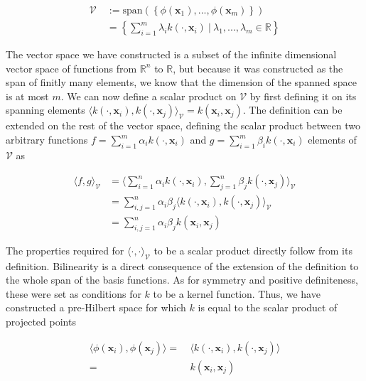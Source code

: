 \begin{equation*}
  \begin{aligned}
    \mathcal{V}\ &:= \text{span}\left(\left\{\phi(\mathbf{x}_1), ..., \phi(\mathbf{x}_m)\right\}\right)\\    
    &= \left\{ \sum_{i=1}^m\lambda_ik(\cdot, \mathbf{x}_i)\ |\ \lambda_1, ..., \lambda_m \in \mathbb{R} \right\}
  \end{aligned}
\end{equation*}

The vector space we have constructed is a subset of the infinite dimensional vector space of functions from $\mathbb{R}^n$ to $\mathbb{R}$, but because it was constructed as the span of finitly many elements, we know that the dimension of the spanned space is at most $m$. We can now define a scalar product on $\mathcal{V}$ by first defining it on its spanning elements $\langle k(\cdot, \mathbf{x}_i), k(\cdot, \mathbf{x}_j)\rangle_{\mathcal{V}} = k(\mathbf{x}_i, \mathbf{x}_j)$. The definition can be extended on the rest of the vector space, defining the scalar product between two arbitrary functions $f = \sum_{i=1}^m\alpha_ik(\cdot, \mathbf{x}_i)$ and $g = \sum_{i=1}^m\beta_ik(\cdot, \mathbf{x}_i)$ elements of $\mathcal{V}$ as

\begin{equation}
  \begin{aligned}
    \langle f, g\rangle_{\mathcal{V}}
    &= \langle \sum_{i=1}^n\alpha_ik(\cdot, \mathbf{x}_i), \sum_{j=1}^n\beta_jk(\cdot, \mathbf{x}_j)\rangle_{\mathcal{V}} \\
    &= \sum_{i,j=1}^n\alpha_i\beta_j \langle k\left(\cdot, \mathbf{x}_i\right), k\left(\cdot, \mathbf{x}_j\right)\rangle_{\mathcal{V}} \\
    &= \sum_{i,j=1}^n\alpha_i\beta_j k\left(\mathbf{x}_i, \mathbf{x}_j\right)
    \end{aligned}
\end{equation}

The properties required for $\langle\cdot, \cdot\rangle_{\mathcal{V}}$ to be a scalar product directly follow from its definition. Bilinearity is a direct consequence of the extension of the definition to the whole span of the basis functions. As for symmetry and positive definiteness, these were set as conditions for $k$ to be a kernel function. Thus, we have constructed a pre-Hilbert space for which $k$ is equal to the scalar product of projected points

\begin{equation*}
  \begin{aligned}
    \langle \phi(\mathbf{x}_i), \phi(\mathbf{x}_j)\rangle =\ &\langle k\left(\cdot, \mathbf{x}_i\right), k\left(\cdot, \mathbf{x}_j\right)\rangle \\
    =\ &k(\mathbf{x}_i, \mathbf{x}_j)
  \end{aligned}
\end{equation*}

